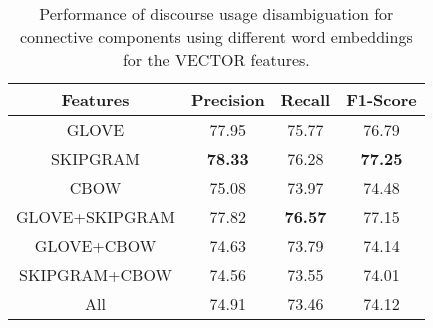 \begin{table}[ht]
\centering
\begin{tabular}{|c|c|c|c|}
\hline

\bf Features        & \bf Precision & \bf Recall & \bf F1-Score \\ \hline
    GLOVE           &     77.95     &     75.77  &     76.79    \\ \hline
    SKIPGRAM        & \bf 78.33     &     76.28  & \bf 77.25    \\ \hline
    CBOW            &     75.08     &     73.97  &     74.48    \\ \hline
    GLOVE+SKIPGRAM  &     77.82     & \bf 76.57  &     77.15    \\ \hline
    GLOVE+CBOW      &     74.63     &     73.79  &     74.14    \\ \hline
    SKIPGRAM+CBOW   &     74.56     &     73.55  &     74.01    \\ \hline
    All             &     74.91     &     73.46  &     74.12    \\ \hline

\end{tabular}
\caption{\label{t:recognition-vectors} Performance of discourse usage
disambiguation for connective components using different word embeddings for
the VECTOR features. }
\end{table}
